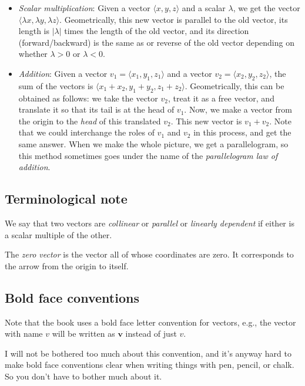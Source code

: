 \documentclass[10pt]{amsart}
\begin{document}
\begin{itemize}
\item {\em Scalar multiplication}: Given a vector $\langle x,y,z
  \rangle$ and a scalar $\lambda$, we get the vector $\langle \lambda
  x, \lambda y, \lambda z \rangle$. Geometrically, this new vector is
  parallel to the old vector, its length is $|\lambda|$ times the
  length of the old vector, and its direction (forward/backward) is
  the same as or reverse of the old vector depending on whether
  $\lambda > 0$ or $\lambda < 0$.
\item {\em Addition}: Given a vector $v_1 = \langle x_1, y_1, z_1
  \rangle$ and a vector $v_2 = \langle x_2, y_2, z_2 \rangle$, the sum
  of the vectors is $\langle x_1 + x_2, y_1 + y_2, z_1 + z_2
  \rangle$. Geometrically, this can be obtained as follows: we take
  the vector $v_2$, treat it as a free vector, and translate it so
  that its tail is at the head of $v_1$. Now, we make a vector from
  the origin to the {\em head} of this translated $v_2$. This new
  vector is $v_1 + v_2$. Note that we could interchange the roles of
  $v_1$ and $v_2$ in this process, and get the same answer. When we
  make the whole picture, we get a parallelogram, so this method
  sometimes goes under the name of the {\em parallelogram law of
  addition}.
\end{itemize}

\subsection{Terminological note}

We say that two vectors are {\em collinear} or {\em parallel} or {\em
  linearly dependent} if either is a scalar multiple of the other.

The {\em zero vector} is the vector all of whose coordinates are
zero. It corresponds to the arrow from the origin to itself.

\subsection{Bold face conventions}

Note that the book uses a bold face letter convention for vectors,
e.g., the vector with name $v$ will be written as $\mathbf{v}$ instead
of just $v$.

I will not be bothered too much about this convention, and it's anyway
hard to make bold face conventions clear when writing things with pen,
pencil, or chalk. So you don't have to bother much about it.
\end{document}
